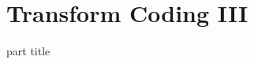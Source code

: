 
\DeclareMathOperator{\cwd}{codeword}
\newtheorem{proposition}{Proposition}
\usepackage{forest}
\usepackage{lipsum}
\usepackage{subcaption}
\usepackage{mathtools}
\DeclareMathOperator{\dist}{dist}
\DeclareMathOperator{\dimension}{dim}
\DeclareMathOperator{\gradient}{grad}


\section{Transform Coding III} 
\begin{frame}
 \vspace{12.0ex}
\begin{center}
\begin{beamercolorbox}[sep=12pt,center]{part title}
\insertsection\par
\end{beamercolorbox}
\end{center}
\end{frame}
